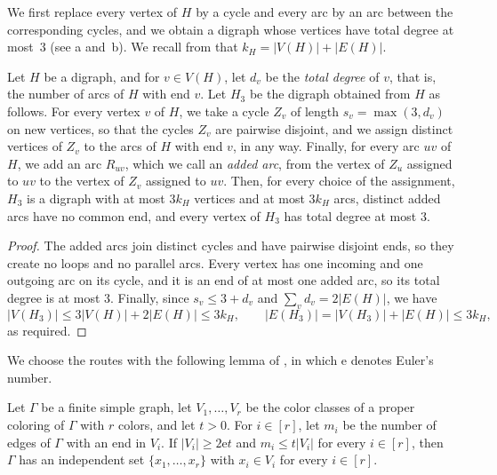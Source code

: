 \documentclass[fontsize=12pt,leading=14pt]{fullpaper}
\begin{document}
We first replace every vertex of $H$ by a cycle and every arc by an arc between the corresponding cycles, and we obtain a digraph whose vertices have total degree at most~$3$ (see a and~b).
We recall from  that $k_H=|V(H)|+|E(H)|$.

\begin{lemma}\label{lem:subcubic}
  Let $H$ be a digraph, and for $v\in V(H)$, let $d_v$ be the \emph{total degree} of $v$, that is, the number of arcs of $H$ with end $v$.
  Let $H_3$ be the digraph obtained from $H$ as follows.
  For every vertex $v$ of $H$, we take a cycle $Z_v$ of length $s_v=\max(3,d_v)$ on new vertices, so that the cycles $Z_v$ are pairwise disjoint, and we assign distinct vertices of $Z_v$ to the arcs of $H$ with end $v$, in any way.
  Finally, for every arc $uv$ of $H$, we add an arc $R_{uv}$, which we call an \emph{added arc}, from the vertex of $Z_u$ assigned to $uv$ to the vertex of $Z_v$ assigned to $uv$.
  Then, for every choice of the assignment, $H_3$ is a digraph with at most $3k_H$ vertices and at most $3k_H$ arcs, distinct added arcs have no common end, and every vertex of $H_3$ has total degree at most $3$.
\end{lemma}

\begin{proof}
  The added arcs join distinct cycles and have pairwise disjoint ends, so they create no loops and no parallel arcs.
  Every vertex has one incoming and one outgoing arc on its cycle, and it is an end of at most one added arc, so its total degree is at most $3$.
  Finally, since $s_v\le3+d_v$ and $\sum_vd_v=2|E(H)|$, we have
  \[
    |V(H_3)|\le3|V(H)|+2|E(H)|\le3k_H,\qquad
    |E(H_3)|=|V(H_3)|+|E(H)|\le3k_H,
  \]
  as required.
\end{proof}

We choose the routes with the following lemma of \textcite{RW12}, in which $\mathrm e$ denotes Euler's number.

\begin{proposition}[{\cite[Lemma~4.2]{RW12}}]\label{prop:indep-transversal}
  Let $\Gamma$ be a finite simple graph, let $V_1,\dots,V_r$ be the color classes of a proper coloring of $\Gamma$ with $r$ colors, and let $t>0$.
  For $i\in[r]$, let $m_i$ be the number of edges of $\Gamma$ with an end in $V_i$.
  If $|V_i|\ge2\mathrm et$ and $m_i\le t|V_i|$ for every $i\in[r]$, then $\Gamma$ has an independent set $\{x_1,\dots,x_r\}$ with $x_i\in V_i$ for every $i\in[r]$.
\end{proposition}
\end{document}
